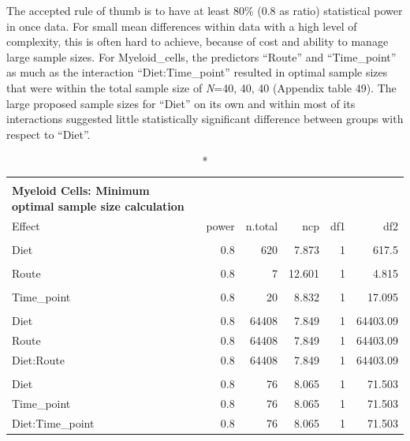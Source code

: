 \documentclass[
  12pt,
  letterpaper,
]{article}
\begin{document}
The accepted rule of thumb is to have at least 80\% (0.8 as ratio) statistical power in once data. For small mean differences within data with a high level of complexity, this is often hard to achieve, because of cost and ability to manage large sample sizes. For Myeloid\_cells, the predictors ``Route'' and ``Time\_point'' as much as the interaction ``Diet:Time\_point'' resulted in optimal sample sizes that were within the total sample size of \emph{N}=40, 40, 40 (Appendix table 49). The large proposed sample sizes for ``Diet'' on its own and within most of its interactions suggested little statistically significant difference between groups with respect to ``Diet''.

\begingroup
\fontsize{12.0pt}{14.4pt}\selectfont
\begin{longtable}{l|rrrrr}
\caption*{
{\large \textbf{Appendix Table 49}} \\ 
{\small \textbf{Myeloid Cells: Minimum optimal sample size calculation}}
} \\ 
\toprule
Effect & {power} & {n.total} & {ncp} & {df1} & {df2} \\ 
\midrule\addlinespace[2.5pt]
\multicolumn{6}{l}{Diet} \\[2.5pt] 
\midrule\addlinespace[2.5pt]
Diet & 0.8 & 620 & 7.873 & 1 & 617.5 \\ 
\midrule\addlinespace[2.5pt]
\multicolumn{6}{l}{Route} \\[2.5pt] 
\midrule\addlinespace[2.5pt]
Route & 0.8 & 7 & 12.601 & 1 & 4.815 \\ 
\midrule\addlinespace[2.5pt]
\multicolumn{6}{l}{Time\_point} \\[2.5pt] 
\midrule\addlinespace[2.5pt]
Time\_point & 0.8 & 20 & 8.832 & 1 & 17.095 \\ 
\midrule\addlinespace[2.5pt]
\multicolumn{6}{l}{Diet:Route} \\[2.5pt] 
\midrule\addlinespace[2.5pt]
Diet & 0.8 & 64408 & 7.849 & 1 & 64403.09 \\ 
Route & 0.8 & 64408 & 7.849 & 1 & 64403.09 \\ 
Diet:Route & 0.8 & 64408 & 7.849 & 1 & 64403.09 \\ 
\midrule\addlinespace[2.5pt]
\multicolumn{6}{l}{Diet:Time\_point} \\[2.5pt] 
\midrule\addlinespace[2.5pt]
Diet & 0.8 & 76 & 8.065 & 1 & 71.503 \\ 
Time\_point & 0.8 & 76 & 8.065 & 1 & 71.503 \\ 
Diet:Time\_point & 0.8 & 76 & 8.065 & 1 & 71.503 \\ 

\end{longtable}
\end{document}
